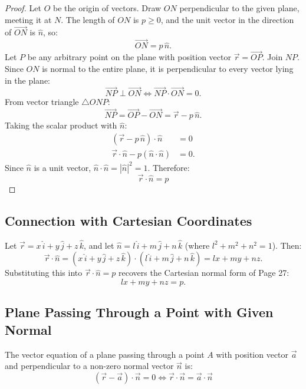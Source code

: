 \begin{proof}
Let $O$ be the origin of vectors.
Draw $ON$ perpendicular to the given plane, meeting it at $N$.
The length of $ON$ is $p \ge 0$, and the unit vector in the direction of $\vec{ON}$ is $\hat{n}$, so:
\begin{equation}
    \vec{ON} = p\,\hat{n}.
\end{equation}
Let $P$ be any arbitrary point on the plane with position vector $\vec{r} = \vec{OP}$.
Join $NP$. Since $ON$ is normal to the entire plane, it is perpendicular to every vector lying in the plane:
\begin{equation}
    \vec{NP} \perp \vec{ON} \iff \vec{NP} \cdot \vec{ON} = 0.
\end{equation}
From vector triangle $\triangle ONP$:
\begin{equation}
    \vec{NP} = \vec{OP} - \vec{ON} = \vec{r} - p\,\hat{n}.
\end{equation}
Taking the scalar product with $\hat{n}$:
\begin{align}
    (\vec{r} - p\,\hat{n}) \cdot \hat{n} &= 0 \nonumber\\
    \vec{r} \cdot \hat{n} - p(\hat{n} \cdot \hat{n}) &= 0.
\end{align}
Since $\hat{n}$ is a unit vector, $\hat{n} \cdot \hat{n} = |\hat{n}|^2 = 1$. Therefore:
\begin{equation}
    \boxed{\vec{r} \cdot \hat{n} = p}
\end{equation}
\end{proof}

\subsection{Connection with Cartesian Coordinates}
Let $\vec{r} = x\,\hat{i} + y\,\hat{j} + z\,\hat{k}$, and let $\hat{n} = l\,\hat{i} + m\,\hat{j} + n\,\hat{k}$ (where $l^2+m^2+n^2=1$).
Then:
\begin{equation}
    \vec{r} \cdot \hat{n} = (x\,\hat{i} + y\,\hat{j} + z\,\hat{k}) \cdot (l\,\hat{i} + m\,\hat{j} + n\,\hat{k}) = lx + my + nz.
\end{equation}
Substituting this into $\vec{r} \cdot \hat{n} = p$ recovers the Cartesian normal form of Page 27:
\begin{equation}
    lx + my + nz = p.
\end{equation}

\subsection{Plane Passing Through a Point with Given Normal}
\begin{theorembox}
The vector equation of a plane passing through a point $A$ with position vector $\vec{a}$ and perpendicular to a non-zero normal vector $\vec{n}$ is:
\begin{equation}
    \boxed{(\vec{r} - \vec{a}) \cdot \vec{n} = 0 \iff \vec{r} \cdot \vec{n} = \vec{a} \cdot \vec{n}}
\end{equation}
\end{theorembox}

